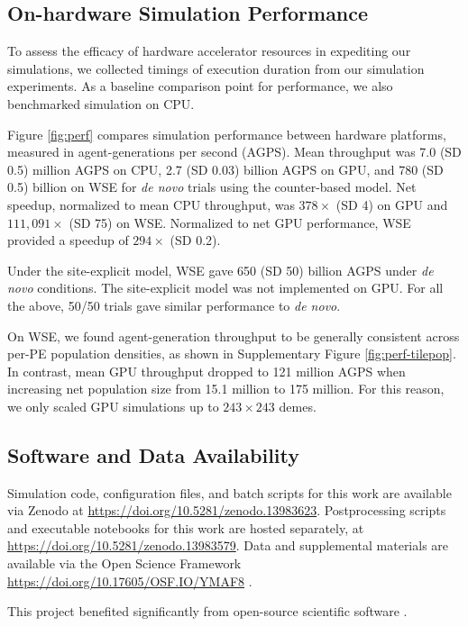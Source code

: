 \subsection{On-hardware Simulation Performance}
\label{sec:performance}



To assess the efficacy of hardware accelerator resources in expediting our simulations, we collected timings of execution duration from our simulation experiments.
As a baseline comparison point for performance, we also benchmarked simulation on CPU.

Figure \ref{fig:perf} compares simulation performance between hardware platforms, measured in agent-generations per second (AGPS).
Mean throughput was 7.0 (SD 0.5) million AGPS on CPU, 2.7 (SD 0.03) billion AGPS on GPU, and 780 (SD 0.5) billion on WSE for \textit{de novo} trials using the counter-based model.
Net speedup, normalized to mean CPU throughput, was $378\times$ (SD 4) on GPU and $111,091\times$ (SD 75) on WSE.
Normalized to net GPU performance, WSE provided a speedup of $294\times$ (SD 0.2).

Under the site-explicit model, WSE gave 650 (SD 50) billion AGPS under \textit{de novo} conditions.
The site-explicit model was not implemented on GPU.
For all the above, 50/50 trials gave similar performance to \textit{de novo}.

On WSE, we found agent-generation throughput to be generally consistent across per-PE population densities, as shown in Supplementary Figure \ref{fig:perf-tilepop}.
In contrast, mean GPU throughput dropped to 121 million AGPS when increasing net population size from 15.1 million to 175 million.
For this reason, we only scaled GPU simulations up to $243 \times 243$ demes.

\subsection{Software and Data Availability} \label{sec:materials}

Simulation code, configuration files, and batch scripts for this work are available via Zenodo at \url{https://doi.org/10.5281/zenodo.13983623}.
Postprocessing scripts and executable notebooks for this work are hosted separately, at \url{https://doi.org/10.5281/zenodo.13983579}.
Data and supplemental materials are available via the Open Science Framework \url{https://doi.org/10.17605/OSF.IO/YMAF8} \citep{foster2017open}.

This project benefited significantly from open-source scientific software \citep{2020SciPy-NMeth,harris2020array,reback2020pandas,mckinney-proc-scipy-2010,waskom2021seaborn,hunter2007matplotlib,moreno2023teeplot}.

